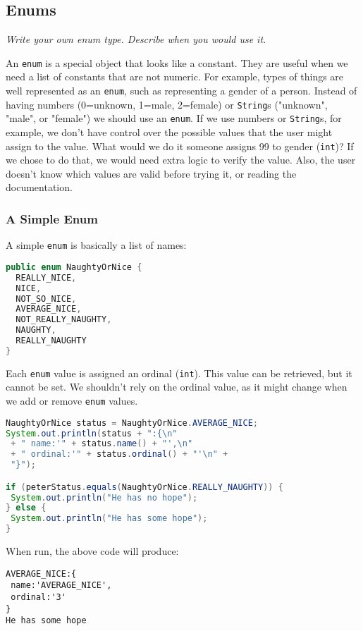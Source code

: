 \subsection{Enums}
\textit{Write your own enum type.  Describe when you would use it.}

An \texttt{enum} is a special object that looks like a constant. They are useful when we need a list of constants that are not numeric. For example, types of things are well represented as an \texttt{enum}, such as representing a gender of a person. Instead of having numbers (0=unknown, 1=male, 2=female) or \texttt{String}s ("unknown", "male", or "female") we should use an \texttt{enum}. If we use numbers or \texttt{String}s, for example, we don't have control over the possible values that the user might assign to the value. What would we do it someone assigns 99 to gender (\texttt{int})? If we chose to do that, we would need extra logic to verify the value. Also, the user doesn't know which values are valid before trying it, or reading the documentation.

\subsubsection{A Simple Enum}
A simple \texttt{enum} is basically a list of names:
\begin{lstlisting}[language=Java]
public enum NaughtyOrNice {
  REALLY_NICE,
  NICE,
  NOT_SO_NICE,
  AVERAGE_NICE,
  NOT_REALLY_NAUGHTY,
  NAUGHTY,
  REALLY_NAUGHTY
}
\end{lstlisting}

Each \texttt{enum} value is assigned an ordinal (\texttt{int}). This value can be retrieved, but it cannot be set. We shouldn't rely on the ordinal value, as it might change when we add or remove \texttt{enum} values.

\begin{lstlisting}[language=Java]
NaughtyOrNice status = NaughtyOrNice.AVERAGE_NICE;
System.out.println(status + ":{\n"
 + " name:'" + status.name() + "',\n"
 + " ordinal:'" + status.ordinal() + "'\n" +
 "}");

if (peterStatus.equals(NaughtyOrNice.REALLY_NAUGHTY)) {
 System.out.println("He has no hope");
} else {
 System.out.println("He has some hope");
}
\end{lstlisting}

When run, the above code will produce:
\begin{lstlisting}
AVERAGE_NICE:{
 name:'AVERAGE_NICE',
 ordinal:'3'
}
He has some hope
\end{lstlisting}

